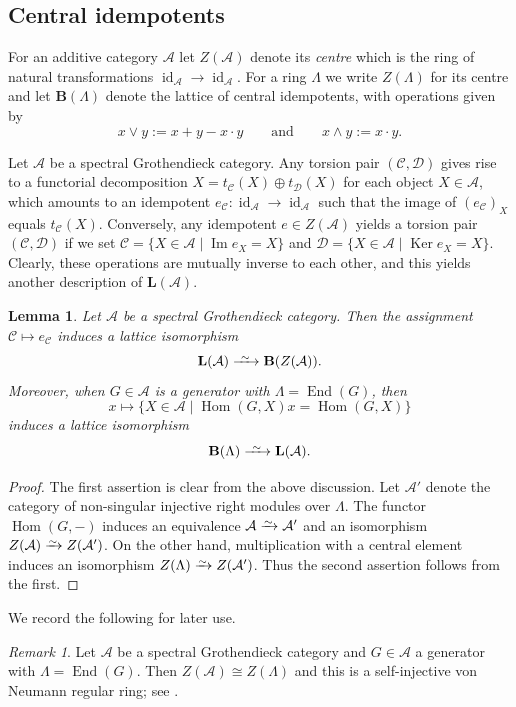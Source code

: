 \documentclass[a4paper]{amsart}
\theoremstyle{plain}
\newtheorem{lem}[thm]{Lemma}
\theoremstyle{definition}
\theoremstyle{remark}
\newtheorem{rem}[thm]{Remark}
\numberwithin{equation}{section}
\newcommand{\End}{\operatorname{End}}
\newcommand{\Hom}{\operatorname{Hom}}
\newcommand{\id}{\operatorname{id}}
\renewcommand{\Im}{\operatorname{Im}}
\newcommand{\Ker}{\operatorname{Ker}}
\newcommand{\iso}{\xrightarrow{\raisebox{-.4ex}[0ex][0ex]{$\scriptstyle{\sim}$}}}
\newcommand{\longiso}{\xrightarrow{\ \raisebox{-.4ex}[0ex][0ex]{$\scriptstyle{\sim}$}\ }}
\def\A{\mathcal A}
\def\C{\mathcal C}
\def\D{\mathcal D}
\def\bfB{\mathbf B}
\def\bfL{\mathbf L}
\def\La{\Lambda}
\begin{document}
\subsection*{Central idempotents}

For an additive category $\A$ let $Z(\A)$ denote its \emph{centre}
which is the ring of natural transformations $\id_\A\to\id_\A$. For a
ring $\La$ we write $Z(\La)$ for its centre and let $\bfB(\La)$ denote
the lattice of central idempotents, with operations given by
  \[x\vee y :=x+y-x\cdot y \qquad\text{and}\qquad x\wedge y:=x\cdot
    y.\] 

Let $\A$ be a spectral Grothendieck category. Any torsion pair
$(\C,\D)$ gives rise to a functorial decomposition $X=t_\C(X)\oplus
t_\D(X)$ for each object $X\in\A$, which amounts to an idempotent
$e_\C\colon\id_\A\to\id_\A$ such that the image of $(e_\C)_X$ equals
$t_\C(X)$. Conversely, any idempotent $e\in Z(\A)$ yields a torsion
pair $(\C,\D)$ if we set $\C=\{X\in\A\mid \Im e_X=X\}$ and
$\D=\{X\in\A\mid \Ker e_X=X\}$. Clearly, these operations are mutually
inverse to each other, and this yields another description of
$\bfL(\A)$.

\begin{lem}\label{le:centre}
  Let $\A$ be a spectral Grothendieck category. Then the assignment
  $\C\mapsto e_\C$ induces a lattice isomorphism
  \[\bfL(\A)\longiso\bfB(Z(\A)).\]
  Moreover, when $G\in\A$ is a generator with $\La=\End(G)$, then
   \[x\longmapsto\{X\in\A\mid \Hom(G,X)x=\Hom(G,X)\}\] induces a lattice isomorphism
  \[\bfB(\La)\longiso\bfL(\A).\]
\end{lem}
\begin{proof}
  The first assertion is clear from the above discussion. Let $\A'$
  denote the category of non-singular injective right modules over
  $\La$.  The functor $\Hom(G,-)$ induces an equivalence $\A\iso \A'$
  and an isomorphism $Z(\A)\iso Z(\A')$. On the other hand,
  multiplication with a central element induces an isomorphism
  $Z(\La)\iso Z(\A')$.  Thus the second assertion follows from the
  first.
\end{proof}

We record the following for later use.

\begin{rem}\label{re:centre-regular}
  Let $\A$ be a spectral Grothendieck category and $G\in\A$ a
  generator with $\La=\End(G)$. Then $Z(\A)\cong Z(\La)$ and this is a
  self-injective von Neumann regular ring; see
  \cite[Theorem~2.1]{AS1974}.
\end{rem}
\end{document}
